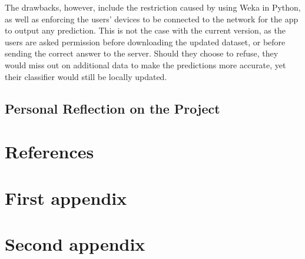 \documentclass{mproj}
\begin{document}
The drawbacks, however, include the restriction caused by using Weka in Python, as well as enforcing the users' devices to be connected to the network for the app to output any prediction. This is not the case with the current version, as the users are asked permission before downloading the updated dataset, or before sending the correct answer to the server. Should they choose to refuse, they would miss out on additional data to make the predictions more accurate, yet their classifier would still be locally updated.

\section{Personal Reflection on the Project}

\chapter{References}




\appendix

\chapter{First appendix}

\chapter{Second appendix}
\end{document}
